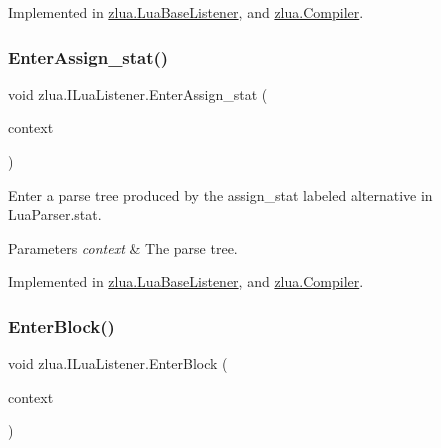 Implemented in \mbox{\hyperlink{classzlua_1_1_lua_base_listener_a86f29737c93fb7e2b6026209916ca3ff}{zlua.\+Lua\+Base\+Listener}}, and \mbox{\hyperlink{classzlua_1_1_compiler_a60ee0650123807779b316af7cf7b213d}{zlua.\+Compiler}}.

\mbox{\label{interfacezlua_1_1_i_lua_listener_a6c89bd1b72debe5db0a3bd633af3c6c9}} 
\subsubsection{\texorpdfstring{Enter\+Assign\+\_\+stat()}{EnterAssign\_stat()}}
{\footnotesize\ttfamily void zlua.\+I\+Lua\+Listener.\+Enter\+Assign\+\_\+stat (\begin{DoxyParamCaption}\item[{\mbox{[}\+Not\+Null\mbox{]} \mbox{\hyperlink{classzlua_1_1_lua_parser_1_1_assign__stat_context}{Lua\+Parser.\+Assign\+\_\+stat\+Context}}}]{context }\end{DoxyParamCaption})}



Enter a parse tree produced by the {\ttfamily assign\+\_\+stat} labeled alternative in Lua\+Parser.\+stat. 


\begin{DoxyParams}{Parameters}
{\em context} & The parse tree.\\
\hline
\end{DoxyParams}


Implemented in \mbox{\hyperlink{classzlua_1_1_lua_base_listener_aec93807e61e1511e344e419191e80d43}{zlua.\+Lua\+Base\+Listener}}, and \mbox{\hyperlink{classzlua_1_1_compiler_aaffd1a513f64fae2076a896a889e00bf}{zlua.\+Compiler}}.

\mbox{\label{interfacezlua_1_1_i_lua_listener_a490f8ae28bd42601f32bd54fc9058e24}} 
\subsubsection{\texorpdfstring{Enter\+Block()}{EnterBlock()}}
{\footnotesize\ttfamily void zlua.\+I\+Lua\+Listener.\+Enter\+Block (\begin{DoxyParamCaption}\item[{\mbox{[}\+Not\+Null\mbox{]} \mbox{\hyperlink{classzlua_1_1_lua_parser_1_1_block_context}{Lua\+Parser.\+Block\+Context}}}]{context }\end{DoxyParamCaption})}



